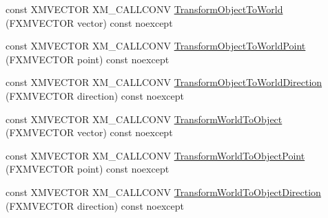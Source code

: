 \begin{DoxyCompactItemize}
\item 
const X\+M\+V\+E\+C\+T\+OR X\+M\+\_\+\+C\+A\+L\+L\+C\+O\+NV \hyperlink{structmage_1_1_transform_node_a93cad83498de7702b0c888260862ec39}{Transform\+Object\+To\+World} (F\+X\+M\+V\+E\+C\+T\+OR vector) const noexcept
\item 
const X\+M\+V\+E\+C\+T\+OR X\+M\+\_\+\+C\+A\+L\+L\+C\+O\+NV \hyperlink{structmage_1_1_transform_node_a0cd8cd0683c141f2632d96bb3c155614}{Transform\+Object\+To\+World\+Point} (F\+X\+M\+V\+E\+C\+T\+OR point) const noexcept
\item 
const X\+M\+V\+E\+C\+T\+OR X\+M\+\_\+\+C\+A\+L\+L\+C\+O\+NV \hyperlink{structmage_1_1_transform_node_aacbb3c43db6a7b67170654e1ffc70892}{Transform\+Object\+To\+World\+Direction} (F\+X\+M\+V\+E\+C\+T\+OR direction) const noexcept
\item 
const X\+M\+V\+E\+C\+T\+OR X\+M\+\_\+\+C\+A\+L\+L\+C\+O\+NV \hyperlink{structmage_1_1_transform_node_a20d7ef8d49095a4ffddf508cad7d89d1}{Transform\+World\+To\+Object} (F\+X\+M\+V\+E\+C\+T\+OR vector) const noexcept
\item 
const X\+M\+V\+E\+C\+T\+OR X\+M\+\_\+\+C\+A\+L\+L\+C\+O\+NV \hyperlink{structmage_1_1_transform_node_a792410956cd6577f3f840341d152ca8a}{Transform\+World\+To\+Object\+Point} (F\+X\+M\+V\+E\+C\+T\+OR point) const noexcept
\item 
const X\+M\+V\+E\+C\+T\+OR X\+M\+\_\+\+C\+A\+L\+L\+C\+O\+NV \hyperlink{structmage_1_1_transform_node_aac30202006ee4ccc2b9e05adb145656b}{Transform\+World\+To\+Object\+Direction} (F\+X\+M\+V\+E\+C\+T\+OR direction) const noexcept
\end{DoxyCompactItemize}

